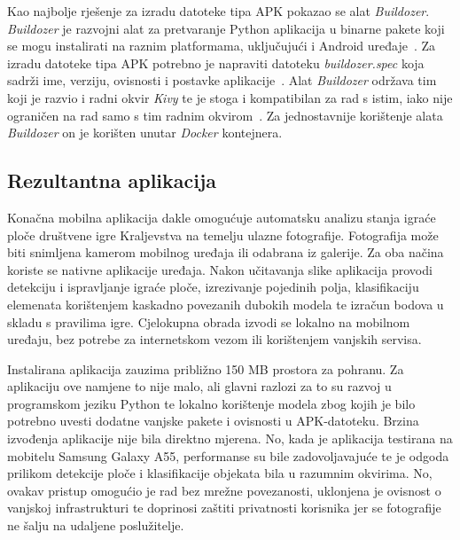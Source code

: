 \documentclass[diplomskirad]{fer}
\begin{document}
			Kao najbolje rješenje za izradu datoteke tipa APK pokazao se alat \textit{Buildozer}. \textit{Buildozer} je razvojni alat za pretvaranje Python aplikacija u binarne pakete koji se mogu instalirati na raznim platformama, uključujući i Android uređaje~\cite{BuildozerDocker}. Za izradu datoteke tipa APK potrebno je napraviti datoteku \textit{buildozer.spec} koja sadrži ime, verziju, ovisnosti i postavke aplikacije~\cite{BuildozerDocker}. Alat \textit{Buildozer} održava tim koji je razvio i radni okvir \textit{Kivy} te je stoga i kompatibilan za rad s istim, iako nije ograničen na rad samo s tim radnim okvirom~\cite{BuildozerDocker}. Za jednostavnije korištenje alata \textit{Buildozer} on je korišten unutar \textit{Docker} kontejnera.
		
		\subsection{Rezultantna aplikacija}
			Konačna mobilna aplikacija dakle omogućuje automatsku analizu stanja igraće ploče društvene igre Kraljevstva na temelju ulazne fotografije. Fotografija može biti snimljena kamerom mobilnog uređaja ili odabrana iz galerije. Za oba načina koriste se nativne aplikacije uređaja. Nakon učitavanja slike aplikacija provodi detekciju i ispravljanje igraće ploče, izrezivanje pojedinih polja, klasifikaciju elemenata korištenjem kaskadno povezanih dubokih modela te izračun bodova u skladu s pravilima igre. Cjelokupna obrada izvodi se lokalno na mobilnom uređaju, bez potrebe za internetskom vezom ili korištenjem vanjskih servisa.
			
			Instalirana aplikacija zauzima približno 150 MB prostora za pohranu. Za aplikaciju ove namjene to nije malo, ali glavni razlozi za to su razvoj u programskom jeziku Python te lokalno korištenje modela zbog kojih je bilo potrebno uvesti dodatne vanjske pakete i ovisnosti u APK-datoteku. Brzina izvođenja aplikacije nije bila direktno mjerena. No, kada je aplikacija testirana na mobitelu Samsung Galaxy A55, performanse su bile zadovoljavajuće te je odgoda prilikom detekcije ploče i klasifikacije objekata bila u razumnim okvirima. No, ovakav pristup omogućio je rad bez mrežne povezanosti, uklonjena je ovisnost o vanjskoj infrastrukturi te doprinosi zaštiti privatnosti korisnika jer se fotografije ne šalju na udaljene poslužitelje.
			
\end{document}
